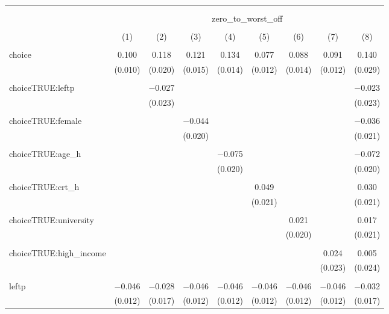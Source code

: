 
\begin{table}[!htbp] \centering 
  \caption{} 
  \label{} 
\begin{tabular}{@{\extracolsep{5pt}}lcccccccc} 
\\[-1.8ex]\hline 
\hline \\[-1.8ex] 
\\[-1.8ex] & \multicolumn{8}{c}{zero\_to\_worst\_off} \\ 
\\[-1.8ex] & (1) & (2) & (3) & (4) & (5) & (6) & (7) & (8)\\ 
\hline \\[-1.8ex] 
 choice & 0.100 & 0.118 & 0.121 & 0.134 & 0.077 & 0.088 & 0.091 & 0.140 \\ 
  & (0.010) & (0.020) & (0.015) & (0.014) & (0.012) & (0.014) & (0.012) & (0.029) \\ 
  & & & & & & & & \\ 
 choiceTRUE:leftp &  & $-$0.027 &  &  &  &  &  & $-$0.023 \\ 
  &  & (0.023) &  &  &  &  &  & (0.023) \\ 
  & & & & & & & & \\ 
 choiceTRUE:female &  &  & $-$0.044 &  &  &  &  & $-$0.036 \\ 
  &  &  & (0.020) &  &  &  &  & (0.021) \\ 
  & & & & & & & & \\ 
 choiceTRUE:age\_h &  &  &  & $-$0.075 &  &  &  & $-$0.072 \\ 
  &  &  &  & (0.020) &  &  &  & (0.020) \\ 
  & & & & & & & & \\ 
 choiceTRUE:crt\_h &  &  &  &  & 0.049 &  &  & 0.030 \\ 
  &  &  &  &  & (0.021) &  &  & (0.021) \\ 
  & & & & & & & & \\ 
 choiceTRUE:university &  &  &  &  &  & 0.021 &  & 0.017 \\ 
  &  &  &  &  &  & (0.020) &  & (0.021) \\ 
  & & & & & & & & \\ 
 choiceTRUE:high\_income &  &  &  &  &  &  & 0.024 & 0.005 \\ 
  &  &  &  &  &  &  & (0.023) & (0.024) \\ 
  & & & & & & & & \\ 
 leftp & $-$0.046 & $-$0.028 & $-$0.046 & $-$0.046 & $-$0.046 & $-$0.046 & $-$0.046 & $-$0.032 \\ 
  & (0.012) & (0.017) & (0.012) & (0.012) & (0.012) & (0.012) & (0.012) & (0.017) \\ 

\end{tabular}
\end{table}
